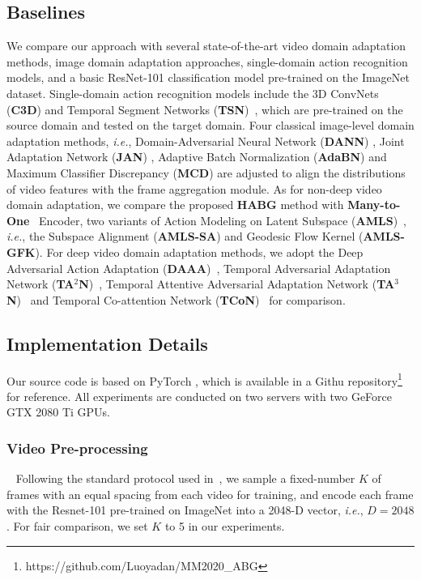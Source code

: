 \subsection{Baselines}
We compare our approach with several state-of-the-art video domain adaptation methods, image domain adaptation approaches, single-domain action recognition models, and a basic ResNet-101 classification model pre-trained on the ImageNet dataset. Single-domain action recognition models include the 3D ConvNets (\textbf{C3D}) \cite{C3D} and Temporal Segment Networks (\textbf{TSN})~\cite{TSN}, which are pre-trained on the source domain and tested on the target domain. Four classical image-level domain adaptation methods, \textit{i.e.}, Domain-Adversarial Neural Network (\textbf{DANN}) \cite{DANN}, Joint Adaptation Network (\textbf{JAN}) \cite{JAN}, Adaptive Batch Normalization (\textbf{AdaBN}) \cite{AdaBN} and Maximum Classifier Discrepancy (\textbf{MCD}) \cite{MCD} are adjusted to align the distributions of video features with the frame aggregation module. As for non-deep video domain adaptation, we compare the proposed \textbf{HABG} method with \textbf{Many-to-One}~\cite{DBLP:journals/ivc/XuZWF16} Encoder, two variants of Action Modeling on Latent Subspace (\textbf{AMLS})~\cite{AMLS}, \textit{i.e.}, the Subspace Alignment (\textbf{AMLS-SA}) and Geodesic Flow Kernel (\textbf{AMLS-GFK}). For deep video domain adaptation methods, we adopt the Deep Adversarial Action Adaptation (\textbf{DAAA})~\cite{AMLS}, Temporal Adversarial Adaptation Network (\textbf{TA$^{2}$N})~\cite{TAN}, Temporal Attentive Adversarial Adaptation Network (\textbf{TA$^{3}$N})~\cite{TAN} and Temporal Co-attention Network (\textbf{TCoN})~\cite{TcoN} for comparison.



\subsection{Implementation Details} Our source code is based on PyTorch \cite{pytorch}, which is available in a Githu repository\footnote{https://github.com/Luoyadan/MM2020\_ABG} for reference. All experiments are conducted on two servers with two GeForce GTX 2080 Ti GPUs.

\subsubsection{Video Pre-processing}~\label{dp}
Following the standard protocol used in~\cite{TAN}, we sample a fixed-number $K$ of frames with an equal spacing from each video for training, and encode each frame with the Resnet-101 \cite{resnet} pre-trained on ImageNet into a 2048-D vector, \textit{i.e.}, $D=2048$. For fair comparison, we set $K$ to 5 in our experiments.


